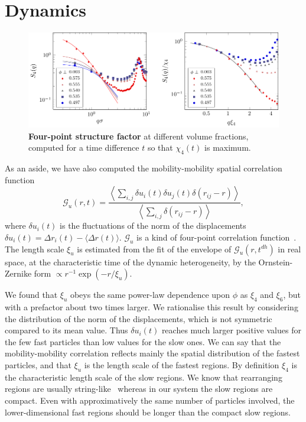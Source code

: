 \documentclass[prl,twocolumn,notitlepage]{revtex4-1}
\begin{document}
\section*{Dynamics}

\begin{figure}
\begin{center}
\includegraphics{generate_figures-figure8.pdf}
\end{center}
\caption{\textbf{Four-point structure factor} at different volume fractions, computed for a time difference $t$ so that $\chi_4(t)$ is maximum.}
	\label{fig:S4}
\end{figure}

As an aside, we have also computed the mobility-mobility spatial correlation function~\cite{Donati1999}
\begin{equation}
	\mathcal{G}_u(r,t) = \frac{
		\left\langle \sum_{i,j}{\delta u_i(t) \delta u_j(t) \delta(r_{ij} -r)} \right\rangle 
	}{
		\left\langle \sum_{i,j}{\delta(r_{ij} -r)} \right\rangle
	},
	\label{eq:mobility_correl}
\end{equation}
where $\delta u_i(t)$ is the fluctuations of the norm of the displacements $\delta u_i(t) = \Delta r_i(t)-\langle\Delta r(t)\rangle$. $\mathcal{G}_u$ is a kind of four-point correlation function~\cite{cavagna2009supercooled}. The length scale $\xi_u$ is estimated from the fit of the envelope of $\mathcal{G}_u(r,t^{dh})$ in real space, at the characteristic time of the dynamic heterogeneity, by the Ornstein-Zernike form $\propto r^{-1}\exp( -r/\xi_u)$. 

We found that $\xi_u$ obeys the same power-law dependence upon $\phi$ as $\xi_4$ and $\xi_6$, but with a prefactor about two times larger. We rationalise this result by considering the distribution of the norm of the displacements, which is not symmetric compared to its mean value. Thus $\delta u_i(t)$ reaches much larger positive values for the few fast particles than low values for the slow ones. We can say that the mobility-mobility correlation reflects mainly the spatial distribution of the fastest particles, and that $\xi_u$ is the length scale of the fastest regions. By definition $\xi_4$ is the characteristic length scale of the slow regions. We know that rearranging regions are usually string-like~\cite{Donati1999} whereas in our system the slow regions are compact. Even with approximatively the same number of particles involved, the lower-dimensional fast regions should be longer than the compact slow regions.



%

\end{document}
